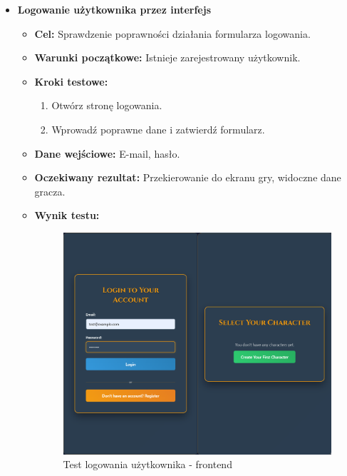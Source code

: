 \begin{itemize}
    \item \textbf{Logowanie użytkownika przez interfejs}
    \begin{itemize}
        \item \textbf{Cel:} Sprawdzenie poprawności działania formularza logowania.
        \item \textbf{Warunki początkowe:} Istnieje zarejestrowany użytkownik.
        \item \textbf{Kroki testowe:}
        \begin{enumerate}
            \item Otwórz stronę logowania.
            \item Wprowadź poprawne dane i zatwierdź formularz.
        \end{enumerate}
        \item \textbf{Dane wejściowe:} E-mail, hasło.
        \item \textbf{Oczekiwany rezultat:} Przekierowanie do ekranu gry, widoczne dane gracza.
        \item \textbf{Wynik testu:}
        \begin{figure}[H]
            \includegraphics[width=480px]{figures/testy/test-login-front.png}
            \caption{Test logowania użytkownika - frontend}
        \end{figure}
    \end{itemize}


\end{itemize}
